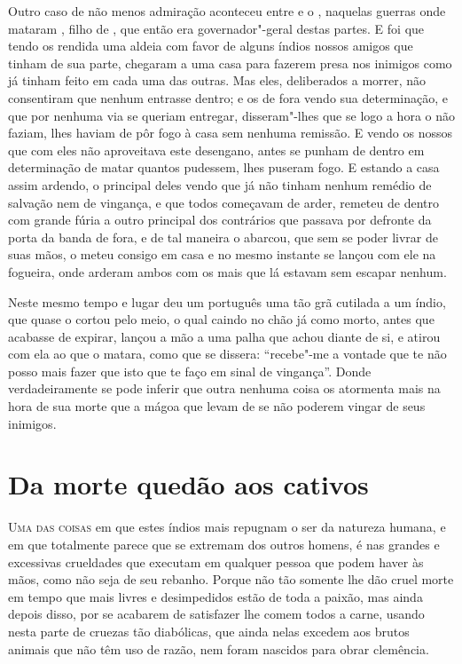 Outro caso de não menos admiração aconteceu entre  e o
, naquelas guerras onde mataram , filho de , que então era governador"-geral destas partes. E foi que tendo os
 rendida uma aldeia com favor de alguns índios nossos amigos que
tinham de sua parte, chegaram a uma casa para fazerem presa nos inimigos
como já tinham feito em cada uma das outras. Mas eles, deliberados a
morrer, não consentiram que nenhum entrasse dentro; e os de fora vendo
sua determinação, e que por nenhuma via se queriam entregar,
disseram"-lhes que se logo a hora o não faziam, lhes haviam de pôr fogo à
casa sem nenhuma remissão. E vendo os nossos que com eles não
aproveitava este desengano, antes se punham de dentro em determinação
de matar quantos pudessem, lhes puseram fogo. E estando a casa assim
ardendo, o principal deles vendo que já não tinham nenhum remédio de			%
salvação nem de vingança, e que todos começavam de arder, remeteu de
dentro com grande fúria a outro principal dos contrários que passava
por defronte da porta da banda de fora, e de tal maneira o abarcou, que
sem se poder livrar de suas mãos, o meteu consigo em casa e no mesmo
instante se lançou com ele na fogueira, onde arderam ambos com os mais
que lá estavam sem escapar nenhum.

Neste mesmo tempo e lugar deu um português uma tão grã cutilada a um
índio, que quase o cortou pelo meio, o qual caindo no chão já como			
morto, antes que acabasse de expirar, lançou a mão a uma palha que achou
diante de si, e atirou com ela ao que o matara, como que se dissera: ``recebe"-me 
a vontade que te não posso mais fazer que isto que te faço em
sinal de vingança''. Donde verdadeiramente se pode inferir que outra
nenhuma coisa os atormenta mais na hora de sua morte que a mágoa 
que levam de se não poderem vingar de seus inimigos.

\chapter[Da morte que dão aos cativos]{Da morte que\break dão aos cativos} 

\noindent\textsc{Uma das coisas} em que estes índios mais repugnam o ser da natureza
humana, e em que totalmente parece que se extremam dos outros homens, é
nas grandes e excessivas crueldades que executam em qualquer pessoa que
podem haver às mãos, como não seja de seu rebanho. Porque não tão
somente lhe dão cruel morte em tempo que mais livres e desimpedidos
estão de toda a paixão, mas ainda depois disso, por se acabarem de			%
satisfazer lhe comem todos a carne, usando nesta parte de cruezas tão			%
diabólicas, que ainda nelas excedem aos brutos animais que não têm uso
de razão, nem foram nascidos para obrar clemência. 

